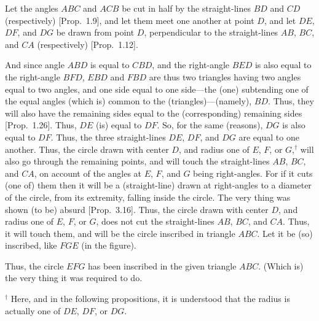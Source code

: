 \begin{Parallel}{}{}
{Let the angles $ABC$ and $ACB$ be cut in half by the
straight-lines $BD$ and $CD$ (respectively) [Prop.~1.9], and let them meet one another
at point $D$, and let $DE$, $DF$, and $DG$ be drawn from
point $D$, perpendicular to the straight-lines $AB$, $BC$, and $CA$ (respectively) [Prop.~1.12].

And since angle $ABD$ is equal to $CBD$, and the right-angle
$BED$ is also equal to the right-angle $BFD$, $EBD$ and $FBD$ are thus two triangles
having two angles equal to two angles, and one side equal to one side---the
(one) subtending one of the equal angles (which is) common to the (triangles)---(namely), $BD$. Thus, they will also have the 
remaining sides equal to the (corresponding) remaining sides [Prop.~1.26]. Thus, $DE$ (is)
equal to $DF$. So, for the same (reasons), $DG$ is also equal
to $DF$. Thus, the three straight-lines $DE$, $DF$, and $DG$ are equal to one another.
Thus, the circle drawn with center $D$, and radius one of $E$, $F$, or $G$,$^\dag$ will also
go through the remaining points, and will  touch the straight-lines $AB$, $BC$, and $CA$, on account of the angles at $E$, $F$, and $G$ being right-angles. For if it cuts (one of) them then it will be a (straight-line)
drawn at right-angles to a diameter of the circle, from its extremity, falling inside
the circle. The very thing was shown (to be) absurd [Prop.~3.16].
Thus, the circle drawn with center $D$, and radius one of $E$, $F$, or $G$,
does not cut the straight-lines $AB$, $BC$, and $CA$. Thus, it will
touch them, and will be the circle inscribed  in triangle $ABC$.
Let it be (so) inscribed, like $FGE$ (in the figure).

Thus, the circle $EFG$ has been inscribed in the given triangle $ABC$.
(Which is) the very thing it was required to do.}
\end{Parallel}
{\footnotesize \noindent$^\dag$ Here, and in the following propositions, it
is understood that the radius is actually one of $DE$, $DF$, or $DG$.}

